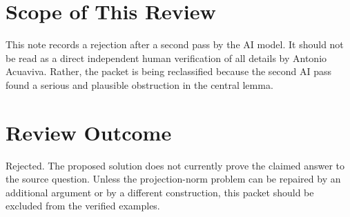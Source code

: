 \documentclass[11pt]{article}
\begin{document}
\section*{Scope of This Review}

This note records a rejection after a second pass by the AI model. It should not be read as a direct independent human verification of all details by Antonio Acuaviva. Rather, the packet is being reclassified because the second AI pass found a serious and plausible obstruction in the central lemma.

\section*{Review Outcome}

Rejected. The proposed solution does not currently prove the claimed answer to the source question. Unless the projection-norm problem can be repaired by an additional argument or by a different construction, this packet should be excluded from the verified examples.
\end{document}
